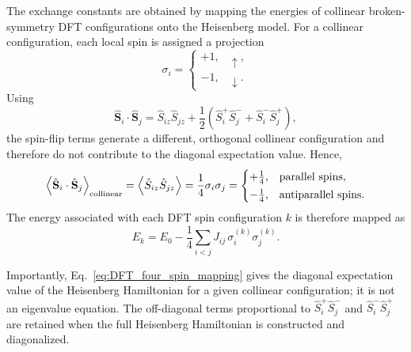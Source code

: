 The exchange constants are obtained by mapping the energies of collinear broken-symmetry DFT configurations onto the Heisenberg model. For a collinear configuration, each local spin is assigned a projection
\begin{equation}
    \sigma_i=
    \begin{cases}
        +1,& \uparrow,\\
        -1,& \downarrow.
    \end{cases}
\end{equation}
Using
\begin{equation}
    \hat{\mathbf S}_i\cdot\hat{\mathbf S}_j
    =
    \hat S_{iz}\hat S_{jz}
    +
    \frac12
    \left(
        \hat S_i^+\hat S_j^-
        +
        \hat S_i^-\hat S_j^+
    \right),
\end{equation}
the spin-flip terms generate a different, orthogonal collinear configuration and therefore do not contribute to the diagonal expectation value. Hence,
\begin{equation}
    \left\langle
    \hat{\mathbf S}_i\cdot\hat{\mathbf S}_j
    \right\rangle_{\rm collinear}
    =
    \left\langle
    \hat S_{iz}\hat S_{jz}
    \right\rangle
    =
    \frac14 \sigma_i \sigma_j
    =
    \begin{cases}
        +\frac14, & \text{parallel spins},\\[2pt]
        -\frac14, & \text{antiparallel spins}.
    \end{cases}
\end{equation}
The energy associated with each DFT spin configuration $k$ is therefore mapped as
\begin{equation}
    \boxed{
    E_k =
    E_0
    -
    \frac14\sum_{i<j}
    J_{ij}\,
    \sigma_i^{(k)}\sigma_j^{(k)}
    }.
    \label{eq:DFT_four_spin_mapping}
\end{equation}

Importantly, Eq.~\eqref{eq:DFT_four_spin_mapping} gives the diagonal expectation value of the Heisenberg Hamiltonian for a given collinear configuration; it is not an eigenvalue equation. The off-diagonal terms proportional to $\hat S_i^+\hat S_j^-$ and $\hat S_i^-\hat S_j^+$ are retained when the full Heisenberg Hamiltonian is constructed and diagonalized.